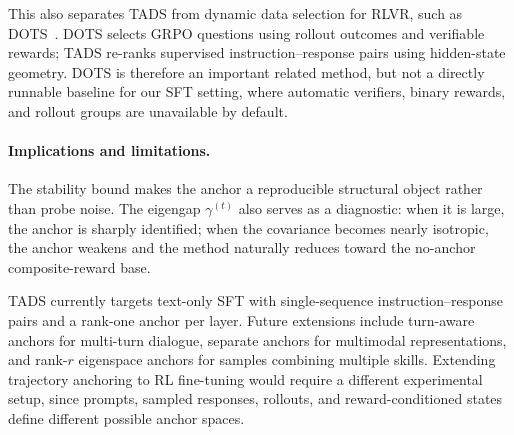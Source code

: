 This also separates \textsc{TADS} from dynamic data selection for
RLVR, such as DOTS~\cite{sun2025dots}. DOTS selects GRPO questions
using rollout outcomes and verifiable rewards; \textsc{TADS}
re-ranks supervised instruction--response pairs using hidden-state
geometry. DOTS is therefore an important related method, but not a
directly runnable baseline for our SFT setting, where automatic
verifiers, binary rewards, and rollout groups are unavailable by
default.

\paragraph{Implications and limitations.}
The stability bound makes the anchor a reproducible structural
object rather than probe noise. The eigengap $\gamma^{(t)}$ also
serves as a diagnostic: when it is large, the anchor is sharply
identified; when the covariance becomes nearly isotropic, the
anchor weakens and the method naturally reduces toward the
no-anchor composite-reward base.

\textsc{TADS} currently targets text-only SFT with single-sequence
instruction--response pairs and a rank-one anchor per layer. Future
extensions include turn-aware anchors for multi-turn dialogue,
separate anchors for multimodal representations, and rank-$r$
eigenspace anchors for samples combining multiple skills.
Extending trajectory anchoring to RL fine-tuning would require a
different experimental setup, since prompts, sampled responses,
rollouts, and reward-conditioned states define different possible
anchor spaces.
